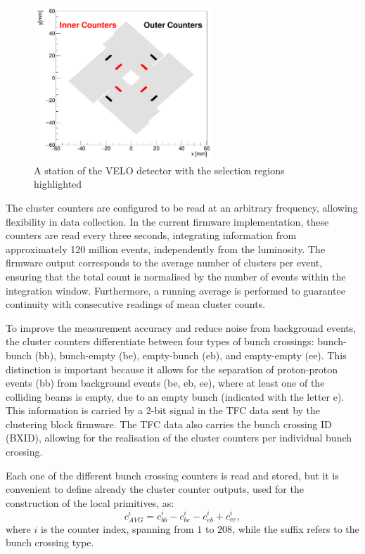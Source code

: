 \begin{figure}
    \centering
    \includegraphics[width=0.6\textwidth]{figures/counters.png}
    \caption{A station of the VELO detector with the selection regions highlighted}
    \label{fig:VELO-counters}
\end{figure}

The cluster counters are configured to be read at an arbitrary frequency, allowing flexibility in data collection. In the current firmware implementation, these counters are read every three seconds, integrating information from approximately 120 million events, independently from the luminosity. 
The firmware output corresponds to the average number of clusters per event, ensuring that the total count is normalised by the number of events within the integration window. Furthermore, a running average is performed to guarantee continuity with consecutive readings of mean cluster counts.

To improve the measurement accuracy and reduce noise from background events, the cluster counters differentiate between four types of bunch crossings: bunch-bunch (bb), bunch-empty (be), empty-bunch (eb), and empty-empty (ee). This distinction is important because it allows for the separation of proton-proton events (bb) from background events (be, eb, ee), where at least one of the colliding beams is empty, due to an empty bunch (indicated with the letter e). This information is carried by a 2-bit signal in the TFC data sent by the clustering block firmware. The TFC data also carries the bunch crossing ID (BXID), allowing for the realisation of the cluster counters per individual bunch crossing.

Each one of the different bunch crossing counters is read and stored, but it is convenient to define already the cluster counter outputs, used for the construction of the local primitives, as: 
\begin{equation}
    c^i_{AVG} = c^i_{bb} - c^i_{be} - c^i_{eb} + c^i_{ee},
\end{equation}
where $i$ is the counter index, spanning from $1$ to $208$, while the suffix refers to the bunch crossing type.

